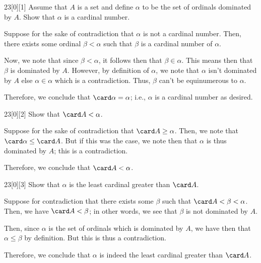 \documentclass{article}
\begin{document}
\begin{hw}{23}[0][1]
	Assume that $A$ is a set and define $\alpha$ to be the set of ordinals dominated by $A$. Show that $\alpha$ is a cardinal number.
\end{hw}
\begin{solution}
	Suppose for the sake of contradiction that $\alpha$ is not a cardinal number. Then, there exists some ordinal $\beta < \alpha$ such that $\beta$ is a cardinal number of $\alpha$.
	
	Now, we note that since $\beta < \alpha$, it follows then that $\beta \in \alpha$. This means then that $\beta$ is dominated by $A$. However, by definition of $\alpha$, we note that $\alpha$ isn't dominated by $A$ else $\alpha \in \alpha$ which is a contradiction. Thus, $\beta$ can't be equinumerous to $\alpha$.
	
	Therefore, we conclude that $\card \alpha = \alpha$; i.e., $\alpha$ is a cardinal number as desired.
\end{solution}

\begin{hw}{23}[0][2]
	Show that $\card A < \alpha$.
\end{hw}
\begin{solution}
	Suppose for the sake of contradiction that $\card A \geq \alpha$. Then, we note that $\card \alpha \leq \card A$. But if this was the case, we note then that $\alpha$ is thus dominated by $A$; this is a contradiction.
	
	Therefore, we conclude that $\card A < \alpha$.
\end{solution}

\begin{hw}{23}[0][3]
	Show that $\alpha$ is the least cardinal greater than $\card A$.
\end{hw}
\begin{solution}
	Suppose for contradiction that there exists some $\beta$ such that $\card A < \beta < \alpha$. Then, we have $\card A < \beta$; in other words, we see that $\beta$ is not dominated by $A$.
	
	Then, since $\alpha$ is the set of ordinals which is dominated by $A$, we have then that $\alpha \leq \beta$ by definition. But this is thus a contradiction.
	
	Therefore, we conclude that $\alpha$ is indeed the least cardinal greater than $\card A$.
\end{solution}
\end{document}
